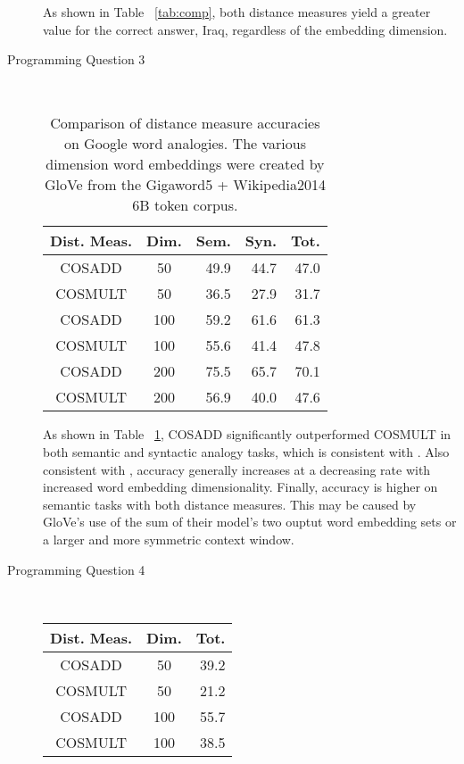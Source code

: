 \documentclass{article}
\newcommand*{\0}{\Vec{0}}
\begin{document}
\begin{description}
\begin{table}[H]
{			}
			\label{tab:comp}
		\end{table}
		As shown in Table ~\ref{tab:comp}, both distance measures yield a greater value for the correct answer, Iraq, regardless of the embedding dimension.
	\item[Programming Question 3] \hfill \\
		\begin{table}[H]
			\centering
			\begin{tabular}{|cc|rrr|}
				\hline
				Dist. Meas. & Dim. & Sem. & Syn. & Tot. \\
				\hline
				COSADD & 50 & 49.9 & 44.7 & 47.0 \\
				COSMULT & 50 & 36.5 & 27.9 & 31.7 \\
				\hline
				COSADD & 100 & 59.2 & 61.6 & 61.3 \\
				COSMULT & 100 & 55.6 & 41.4 & 47.8 \\
				\hline
				COSADD & 200 & 75.5 & 65.7 & 70.1 \\
				COSMULT & 200 & 56.9 & 40.0 & 47.6 \\
				\hline
			\end{tabular}
			\caption{Comparison of distance measure accuracies on Google word analogies. The various dimension word embeddings were created by GloVe from the Gigaword5 + Wikipedia2014 6B token corpus.}
			\label{tab:google}
		\end{table}
		As shown in Table ~\ref{tab:google}, COSADD significantly outperformed COSMULT in both semantic and syntactic analogy tasks, which is consistent with \cite{glove}.
		Also consistent with \cite{glove}, accuracy generally increases at a decreasing rate with increased word embedding dimensionality.
		Finally, accuracy is higher on semantic tasks with both distance measures.
		This may be caused by GloVe's use of the sum of their model's two ouptut word embedding sets or a larger and more symmetric context window.\cite{glove} 
	\item[Programming Question 4] \hfill \\
		\begin{table}[H]
			\centering
			\begin{tabular}{|cc|r|}
				\hline
				Dist. Meas. & Dim. & Tot. \\
				\hline
				COSADD & 50 & 39.2 \\
				COSMULT & 50 & 21.2 \\
				\hline
				COSADD & 100 & 55.7 \\
				COSMULT & 100 & 38.5 \\

\end{tabular}
\end{table}
\end{description}
\end{document}
